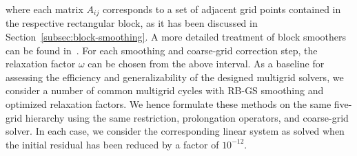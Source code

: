 where each matrix $A_{ij}$ corresponds to a set of adjacent grid points contained in the respective rectangular block, as it has been discussed in Section~\ref{subsec:block-smoothing}.
A more detailed treatment of block smoothers can be found in~\cite{trottenberg2000multigrid}.
For each smoothing and coarse-grid correction step, the relaxation factor $\omega$ can be chosen from the above interval.
As a baseline for assessing the efficiency and generalizability of the designed multigrid solvers, we consider a number of common multigrid cycles with RB-GS smoothing and optimized relaxation factors.
We hence formulate these methods on the same five-grid hierarchy using the same restriction, prolongation operators, and coarse-grid solver.
In each case, we consider the corresponding linear system as solved when the initial residual has been reduced by a factor of $10^{-12}$.

